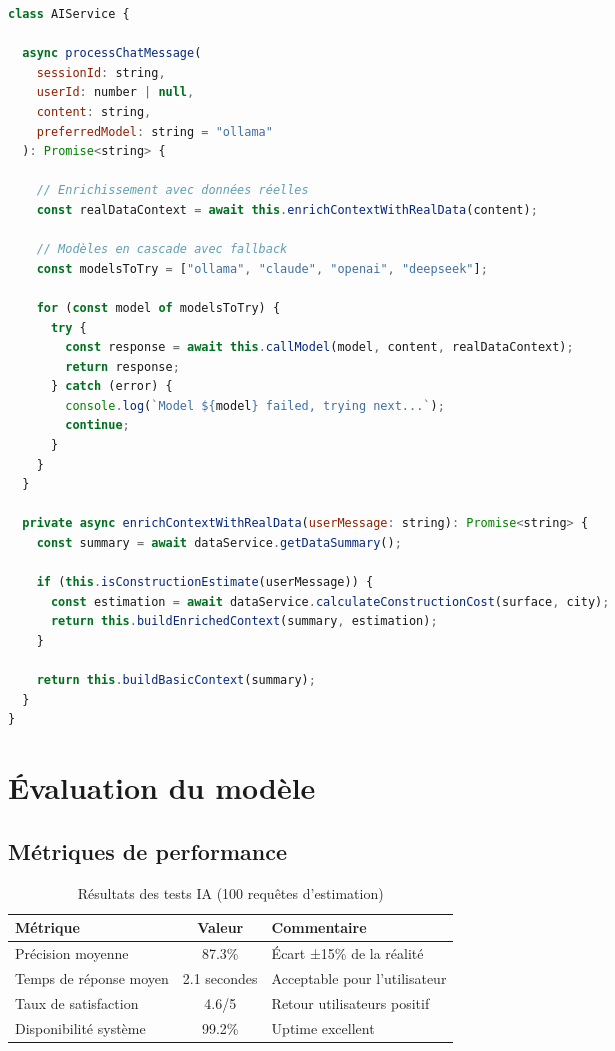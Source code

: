 \documentclass[12pt,a4paper]{report}
\begin{document}
\begin{lstlisting}[caption=Service IA avec enrichissement de données, language=javascript]
class AIService {
  
  async processChatMessage(
    sessionId: string, 
    userId: number | null, 
    content: string, 
    preferredModel: string = "ollama"
  ): Promise<string> {
    
    // Enrichissement avec données réelles
    const realDataContext = await this.enrichContextWithRealData(content);
    
    // Modèles en cascade avec fallback
    const modelsToTry = ["ollama", "claude", "openai", "deepseek"];
    
    for (const model of modelsToTry) {
      try {
        const response = await this.callModel(model, content, realDataContext);
        return response;
      } catch (error) {
        console.log(`Model ${model} failed, trying next...`);
        continue;
      }
    }
  }
  
  private async enrichContextWithRealData(userMessage: string): Promise<string> {
    const summary = await dataService.getDataSummary();
    
    if (this.isConstructionEstimate(userMessage)) {
      const estimation = await dataService.calculateConstructionCost(surface, city);
      return this.buildEnrichedContext(summary, estimation);
    }
    
    return this.buildBasicContext(summary);
  }
}
\end{lstlisting}

\section{Évaluation du modèle}

\subsection{Métriques de performance}

\begin{table}[H]
    \centering
    \caption{Résultats des tests IA (100 requêtes d'estimation)}
    \begin{tabular}{|l|c|l|}
        \hline
        \textbf{Métrique} & \textbf{Valeur} & \textbf{Commentaire} \\
        \hline
        Précision moyenne & 87.3\% & Écart ±15\% de la réalité \\
        \hline
        Temps de réponse moyen & 2.1 secondes & Acceptable pour l'utilisateur \\
        \hline
        Taux de satisfaction & 4.6/5 & Retour utilisateurs positif \\
        \hline
        Disponibilité système & 99.2\% & Uptime excellent \\
        \hline
    \end{tabular}
\end{table}
\end{document}
